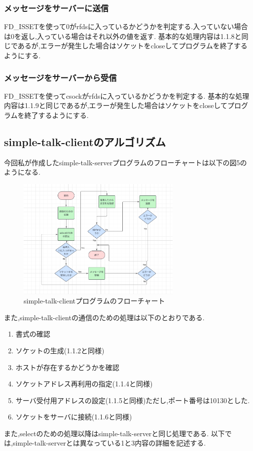 \documentclass[dvipdfmx]{jarticle}
\begin{document}
\subsubsection{メッセージをサーバーに送信}
FD\_ISSETを使って0がrfdsに入っているかどうかを判定する.入っていない場合は0を返し,入っている場合はそれ以外の値を返す.\cite{17}
基本的な処理内容は1.1.8と同じであるが,エラーが発生した場合はソケットをcloseしてプログラムを終了するようにする.
\subsubsection{メッセージをサーバーから受信}
FD\_ISSETを使ってcsockがrfdsに入っているかどうかを判定する.
基本的な処理内容は1.1.9と同じであるが,エラーが発生した場合はソケットをcloseしてプログラムを終了するようにする.
\subsection{simple-talk-clientのアルゴリズム}
今回私が作成したsimple-talk-serverプログラムのフローチャートは以下の図5のようになる.
\begin{figure}[h]
    \center
    \includegraphics[width=8cm]{hurotyaclient.png}
    \caption{simple-talk-clientプログラムのフローチャート}
\end{figure}
また,simple-talk-clientの通信のための処理は以下のとおりである.
\begin{enumerate}
    \item 書式の確認
    \item ソケットの生成(1.1.2と同様)
    \item ホストが存在するかどうかを確認
    \item ソケットアドレス再利用の指定(1.1.4と同様)
    \item サーバ受付用アドレスの設定(1.1.5と同様)ただし,ポート番号は10130とした.
    \item ソケットをサーバに接続(1.1.6と同様)
\end{enumerate}
また,selectのための処理以降はsimple-talk-serverと同じ処理である.
以下では,simple-talk-serverとは異なっている1と3内容の詳細を記述する.
\end{document}

